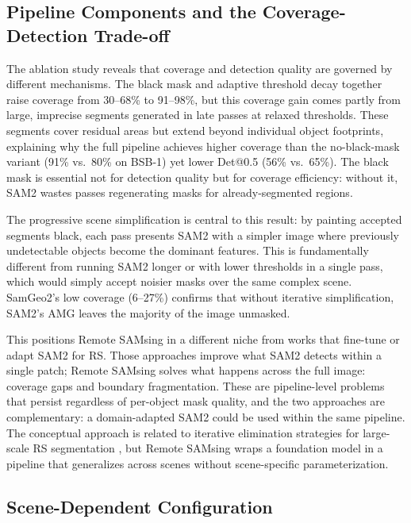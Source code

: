 \documentclass[review,11pt,authoryear]{elsarticle}
\begin{document}
\subsection{Pipeline Components and the Coverage-Detection Trade-off}
\label{sec:disc_components}

The ablation study reveals that coverage and detection quality are governed by different mechanisms. The black mask and adaptive threshold decay together raise coverage from 30--68\% to 91--98\%, but this coverage gain comes partly from large, imprecise segments generated in late passes at relaxed thresholds. These segments cover residual areas but extend beyond individual object footprints, explaining why the full pipeline achieves higher coverage than the no-black-mask variant (91\% vs.\ 80\% on BSB-1) yet lower Det@0.5 (56\% vs.\ 65\%). The black mask is essential not for detection quality but for coverage efficiency: without it, SAM2 wastes passes regenerating masks for already-segmented regions.

The progressive scene simplification is central to this result: by painting accepted segments black, each pass presents SAM2 with a simpler image where previously undetectable objects become the dominant features. This is fundamentally different from running SAM2 longer or with lower thresholds in a single pass, which would simply accept noisier masks over the same complex scene. SamGeo2's low coverage (6--27\%) confirms that without iterative simplification, SAM2's AMG leaves the majority of the image unmasked.

This positions Remote SAMsing in a different niche from works that fine-tune or adapt SAM2 for RS. Those approaches improve what SAM2 detects within a single patch; Remote SAMsing solves what happens across the full image: coverage gaps and boundary fragmentation. These are pipeline-level problems that persist regardless of per-object mask quality, and the two approaches are complementary: a domain-adapted SAM2 could be used within the same pipeline. The conceptual approach is related to iterative elimination strategies for large-scale RS segmentation \citep{shepherd2019large_scale}, but Remote SAMsing wraps a foundation model in a pipeline that generalizes across scenes without scene-specific parameterization.

\subsection{Scene-Dependent Configuration}
\label{sec:disc_config}
\end{document}
